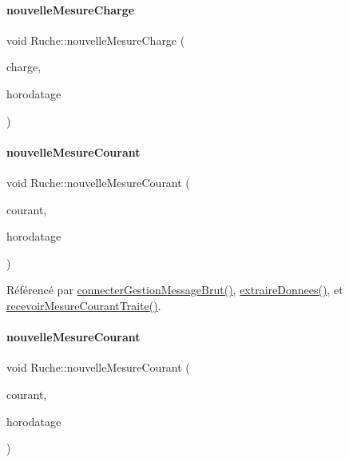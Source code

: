 \paragraph{\texorpdfstring{nouvelle\+Mesure\+Charge}{nouvelleMesureCharge}\hspace{0.1cm}{\footnotesize\ttfamily [2/2]}}
{\footnotesize\ttfamily void Ruche\+::nouvelle\+Mesure\+Charge (\begin{DoxyParamCaption}\item[{double}]{charge,  }\item[{Q\+String}]{horodatage }\end{DoxyParamCaption})\hspace{0.3cm}{\ttfamily [signal]}}

\mbox{\label{class_ruche_a46d8191444302b02a52d1128c5650730}} 
\paragraph{\texorpdfstring{nouvelle\+Mesure\+Courant}{nouvelleMesureCourant}\hspace{0.1cm}{\footnotesize\ttfamily [1/2]}}
{\footnotesize\ttfamily void Ruche\+::nouvelle\+Mesure\+Courant (\begin{DoxyParamCaption}\item[{Q\+String}]{courant,  }\item[{Q\+String}]{horodatage }\end{DoxyParamCaption})\hspace{0.3cm}{\ttfamily [signal]}}



Référencé par \hyperlink{class_ruche_a9c8e7e3b529676c6dda3d936370af00f}{connecter\+Gestion\+Message\+Brut()}, \hyperlink{class_ruche_a21c0dafeaec03d451590037343e6a3ca}{extraire\+Donnees()}, et \hyperlink{class_ruche_a9e416457e8712d353580b7b242ef0836}{recevoir\+Mesure\+Courant\+Traite()}.

\mbox{\label{class_ruche_a189654383ee5802ccdc4256f2c1171c7}} 
\paragraph{\texorpdfstring{nouvelle\+Mesure\+Courant}{nouvelleMesureCourant}\hspace{0.1cm}{\footnotesize\ttfamily [2/2]}}
{\footnotesize\ttfamily void Ruche\+::nouvelle\+Mesure\+Courant (\begin{DoxyParamCaption}\item[{double}]{courant,  }\item[{Q\+String}]{horodatage }\end{DoxyParamCaption})\hspace{0.3cm}{\ttfamily [signal]}}

